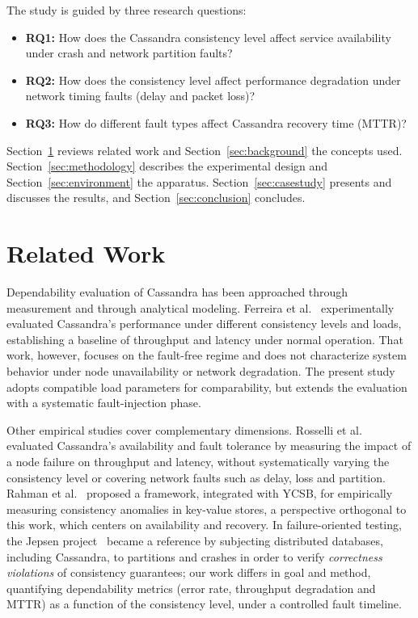 \documentclass[runningheads]{llncs}
\begin{document}
The study is guided by three research questions:
\begin{itemize}
\item \textbf{RQ1:} How does the Cassandra consistency level affect service
availability under crash and network partition faults?
\item \textbf{RQ2:} How does the consistency level affect performance
degradation under network timing faults (delay and packet loss)?
\item \textbf{RQ3:} How do different fault types affect Cassandra recovery time
(MTTR)?
\end{itemize}

Section~\ref{sec:related} reviews related work and Section~\ref{sec:background}
the concepts used. Section~\ref{sec:methodology} describes the experimental
design and Section~\ref{sec:environment} the apparatus.
Section~\ref{sec:casestudy} presents and discusses the results, and
Section~\ref{sec:conclusion} concludes.

\section{Related Work}
\label{sec:related}

Dependability evaluation of Cassandra has been approached through measurement
and through analytical modeling. Ferreira et al.~\cite{ferreira2021}
experimentally evaluated Cassandra's performance under different consistency
levels and loads, establishing a baseline of throughput and latency under normal
operation. That work, however, focuses on the fault-free regime and does not
characterize system behavior under node unavailability or network degradation.
The present study adopts compatible load parameters for comparability, but
extends the evaluation with a systematic fault-injection phase.

Other empirical studies cover complementary dimensions. Rosselli et
al.~\cite{rosselli2016} evaluated Cassandra's availability and fault tolerance by
measuring the impact of a node failure on throughput and latency, without
systematically varying the consistency level or covering network faults such as
delay, loss and partition. Rahman et al.~\cite{rahman2012} proposed a framework,
integrated with YCSB, for empirically measuring consistency anomalies in
key-value stores, a perspective orthogonal to this work, which centers on
availability and recovery. In failure-oriented testing, the Jepsen
project~\cite{jepsen} became a reference by subjecting distributed databases,
including Cassandra, to partitions and crashes in order to verify
\emph{correctness violations} of consistency guarantees; our work differs in goal
and method, quantifying dependability metrics (error rate, throughput degradation
and MTTR) as a function of the consistency level, under a controlled fault
timeline.
\end{document}
